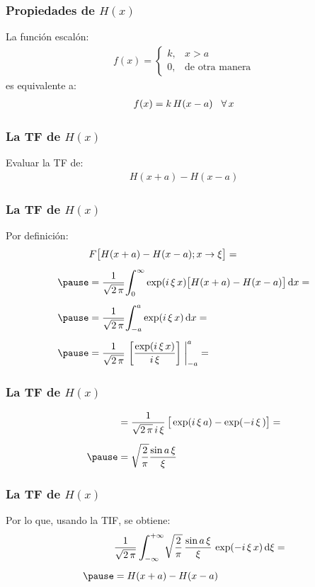 \begin{frame}
\frametitle{Propiedades de $H (x)$}
La función escalón:
\pause
\begin{align*}
f (x) = \begin{cases}
k, & x > a \\[0.5em]
0, & \mbox{de otra manera}
\end{cases}
\end{align*}
es equivalente a:
\pause
\begin{align*}
f (x) = k \, H (x - a) \hspace{0.3cm} \forall \, x
\end{align*}
\end{frame}
\begin{frame}
\frametitle{La TF de $H (x)$}
Evaluar la TF de:
\pause
\begin{align*}
H (x + a) - H (x - a)
\end{align*}
\end{frame}
\begin{frame}
\frametitle{La TF de $H (x)$}
Por definición:
\pause
\begin{eqnarray*}
\begin{aligned}
&F \big[ H(x + a) - H(x - a); x \to \xi \big] = \\[0.5em] \pause
&= \dfrac{1}{\sqrt{2\, \pi}} \scaleint{6ex}_{\bs 0}^{\infty} \exp(i \, \xi \, x) \big[ H (x + a) - H (x - a) \big] \dd{x} = \\[0.5em] \pause
&= \dfrac{1}{\sqrt{2\, \pi}} \scaleint{6ex}_{\bs -a}^{a} \exp(i \, \xi \, x) \dd{x} = \\[0.5em] \pause
&= \dfrac{1}{\sqrt{2\, \pi}} \, \left[ \dfrac{\exp(i \, \xi \, x)}{i \, \xi} \right] \eval_{-a}^{a} =
\end{aligned}
\end{eqnarray*}
\end{frame}
\begin{frame}
\frametitle{La TF de $H (x)$}
\begin{eqnarray*}
\begin{aligned}
&= \dfrac{1}{\sqrt{2\, \pi} \, i \, \xi} \, \big[ \exp(i \, \xi \, a) - \exp(-i \, \xi \, ) \big] = \\[0.5em] \pause
&= \sqrt{\dfrac{2}{\pi}} \dfrac{\sin a \, \xi}{\xi}
\end{aligned}
\end{eqnarray*}
\end{frame}
\begin{frame}
\frametitle{La TF de $H (x)$}
Por lo que, usando la TIF, se obtiene:
\pause
\begin{eqnarray*}
\begin{aligned}
&\dfrac{1}{\sqrt{2 \, \pi}} \, \scaleint{6ex}_{\bs -\infty}^{+\infty} \sqrt{\dfrac{2}{\pi}} \, \dfrac{\sin a \, \xi}{\xi} \, \exp(- i \, \xi \, x) \dd{\xi} = \\[0.5em] \pause
&= H(x + a) - H (x- a)
\end{aligned}
\end{eqnarray*}
\end{frame}
